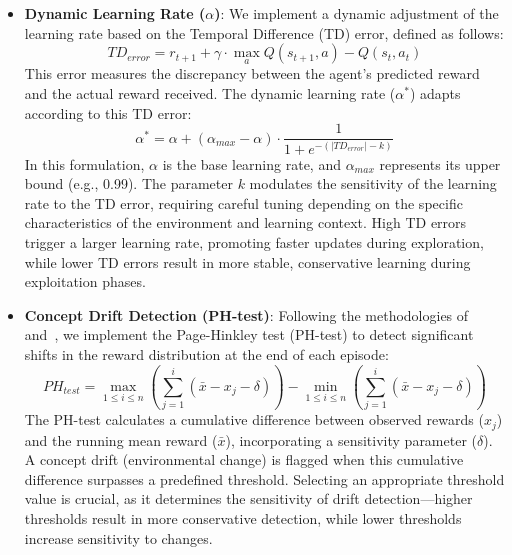\begin{itemize}
    \item \textbf{Dynamic Learning Rate ($\alpha$)}: We implement a dynamic adjustment of the learning rate based on the Temporal Difference (TD) error, defined as follows:
    \begin{equation}
        \label{eq:td_error}
        TD_{error} = r_{t+1} + \gamma \cdot \underset{a}{\max} Q(s_{t+1}, a) - Q(s_t, a_t)
    \end{equation}
    This error measures the discrepancy between the agent’s predicted reward and the actual reward received. The dynamic learning rate ($\alpha^*$) adapts according to this TD error:
    \begin{equation}
        \label{eq:dynamic_learning_rate}
        \alpha^* = \alpha + (\alpha_{max}-\alpha) \cdot \frac{1}{1 + e^{-(|TD_{error}|-k)}}
    \end{equation}
    In this formulation, $\alpha$ is the base learning rate, and $\alpha_{max}$ represents its upper bound (e.g., 0.99). The parameter $k$ modulates the sensitivity of the learning rate to the TD error, requiring careful tuning depending on the specific characteristics of the environment and learning context. High TD errors trigger a larger learning rate, promoting faster updates during exploration, while lower TD errors result in more stable, conservative learning during exploitation phases.

    \item \textbf{Concept Drift Detection (PH-test)}: Following the methodologies of~\citet{mignon2017adaptive} and~\citet{networkdynamicrl}, we implement the Page-Hinkley test (PH-test) to detect significant shifts in the reward distribution at the end of each episode:
    \begin{equation}
        \label{eq:ph_test}
        PH_{test} = \max_{1 \leq i \leq n} \left(\sum_{j=1}^{i}(\bar{x}-x_j-\delta)\right) - \min_{1 \leq i \leq n}\left(\sum_{j=1}^{i}(\bar{x}-x_j-\delta)\right)
    \end{equation}
    The PH-test calculates a cumulative difference between observed rewards ($x_j$) and the running mean reward ($\bar{x}$), incorporating a sensitivity parameter ($\delta$). A concept drift (environmental change) is flagged when this cumulative difference surpasses a predefined threshold. Selecting an appropriate threshold value is crucial, as it determines the sensitivity of drift detection—higher thresholds result in more conservative detection, while lower thresholds increase sensitivity to changes.


\end{itemize}
